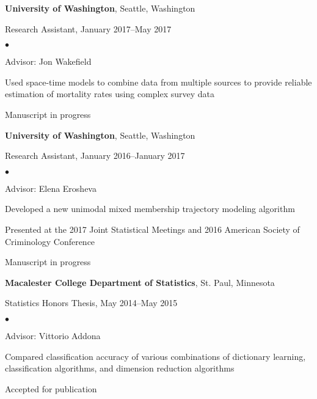 \documentclass[margin,centered]{res}
\newenvironment{list1}{
  \begin{list}{\ding{113}}{%
      \setlength{\itemsep}{0in}
      \setlength{\parsep}{0in} \setlength{\parskip}{0in}
      \setlength{\topsep}{0in} \setlength{\partopsep}{0in}
      \setlength{\leftmargin}{0.17in}}}{\end{list}}
\newenvironment{list2}{
  \begin{list}{$\bullet$}{%
      \setlength{\itemsep}{0in}
      \setlength{\parsep}{0in} \setlength{\parskip}{0in}
      \setlength{\topsep}{0in} \setlength{\partopsep}{0in}
      \setlength{\leftmargin}{0.2in}}}{\end{list}}
\begin{document}
\begin{resume}
{\bf University of Washington},  Seattle, Washington
\begin{list1}
\item[] 
Research Assistant, January 2017--May 2017
\begin{list2}
\vspace*{.05in}
\item Advisor: Jon Wakefield
\item Used space-time models to combine data from multiple sources to provide reliable estimation of mortality rates using complex survey data
\item Manuscript in progress
\end{list2} 
\end{list1}

{\bf University of Washington},  Seattle, Washington
\begin{list1}
\item[] 
Research Assistant, January 2016--January 2017
\begin{list2}
\vspace*{.05in}
\item Advisor: Elena Erosheva
\item Developed a new unimodal mixed membership trajectory modeling algorithm
\item Presented at the 2017 Joint Statistical Meetings and 2016 American Society of Criminology Conference
\item Manuscript in progress
\end{list2} 
\end{list1}




{\bf Macalester College Department of Statistics}, St. Paul, Minnesota
\begin{list1}
\item[] 
Statistics Honors Thesis, May 2014--May 2015
\begin{list2}
\vspace*{.05in}
\item
Advisor: Vittorio Addona
\item Compared classification accuracy of various combinations of dictionary learning, classification algorithms, and dimension reduction algorithms 
\item Accepted for publication
\end{list2} 
\end{list1}



\end{resume}
\end{document}
